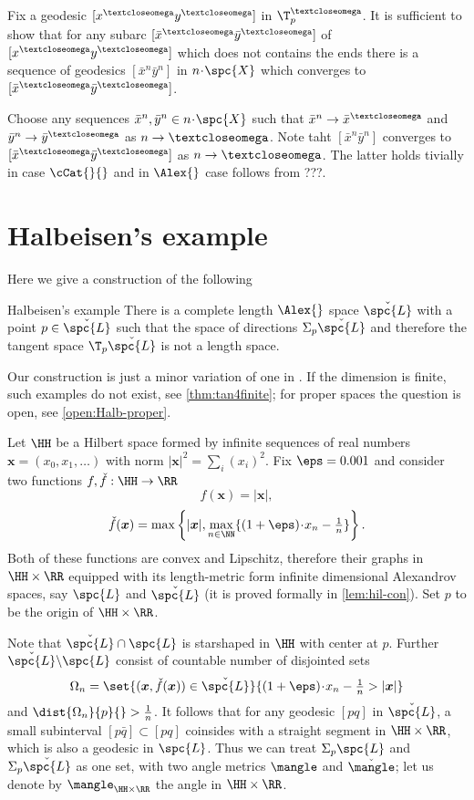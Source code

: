 Fix a geodesic $[x^\o y^\o]$ in $\T^\o_p$.
It is sufficient to show that for any subarc $[\bar x^\o \bar y^\o]$ of $[x^\o y^\o]$
which does not contains the ends
there is a sequence of geodesics $[\bar x^n\bar y^n]$ in $n\cdot \spc{X}$ which converges to $[\bar x^\o\bar y^\o]$.

Choose any sequences $\bar x^n,\bar y^n\in n\cdot \spc{X}$ such that $\bar x^n\to \bar x^\o$ and $\bar y^n\to \bar y^\o$ as $n\to\o$.
Note taht $[\bar x^n \bar y^n]$ 
converges to $[\bar x^\o \bar y^\o]$
as $n\to\o$.
The latter holds tivially in case $\cCat{}{}$
and in $\Alex{}$ case follows from ???.
\qeds



\section{Halbeisen's example}\label{halbeisen}

Here we give a construction of the following

\begin{thm}{Halbeisen's example}\label{Halbeisen's example}
There is a complete length $\Alex{}$ space $\check{\spc{L}}$
with a point $p\in\check{\spc{L}}$ such that the space of directions $\Sigma_p\check{\spc{L}}$ and therefore the tangent space $\T_p\check{\spc{L}}$ is not a length space. 
\end{thm}

Our construction is just a minor variation of one in \cite{halbeisen}.
If the dimension is finite, such examples do not exist, see \ref{thm:tan4finite}; 
for proper spaces the question is open, see \ref{open:Halb-proper}.

Let $\HH$ be a Hilbert space formed by infinite sequences of real numbers $\bm{x}=(x_0,x_1,\dots)$ with norm
$|\bm{x}|^2=\sum_i(x_i)^2$. 
Fix $\eps=0.001$ and consider two functions $f,\check f:\HH\to\RR$
\[f(\bm{x})=|\bm{x}|,\]
\[\check f(\bm{x})
=
\max\left\{|\bm{x}|,\max_{n\in\NN}\{(1+\eps)\cdot x_n-\tfrac{1}{n}\}\right\}.\] 
Both of these functions are convex and Lipschitz, therefore their graphs in $\HH\times \RR$ equipped with its length-metric form infinite dimensional Alexandrov spaces, say $\spc{L}$  and $\check{\spc{L}}$ (it is proved formally in \ref{lem:hil-con}).
Set $p$ to be the origin of $\HH\times \RR$.

Note that $\check{\spc{L}}\cap\spc{L}$ is starshaped in $\HH$ with center at $p$.
Further $\check{\spc{L}}\backslash\spc{L}$ consist of countable number of disjointed sets
\[\Omega_n=\set{(\bm{x},\check f(\bm{x}))\in\check{\spc{L}}}{(1+\eps)\cdot x_n-\tfrac{1}{n}>|\bm{x}|}\]
and $\dist{\Omega_n}{p}{}>\tfrac{1}{n}$.
It follows that for any geodesic $[p q]$ in $\check{\spc{L}}$,
a small subinterval $[p \bar q]\subset [p q]$ 
coinsides with a straight segment in $\HH\times\RR$, 
which is also a geodesic in $\spc{L}$.
Thus we can treat $\Sigma_p\spc{L}$ and $\Sigma_p\check{\spc{L}}$ as one set, with two angle metrics $\mangle$ and $\check\mangle$;
let us denote by $\mangle_{\HH\times \RR}$ the angle in $\HH\times\RR$.

